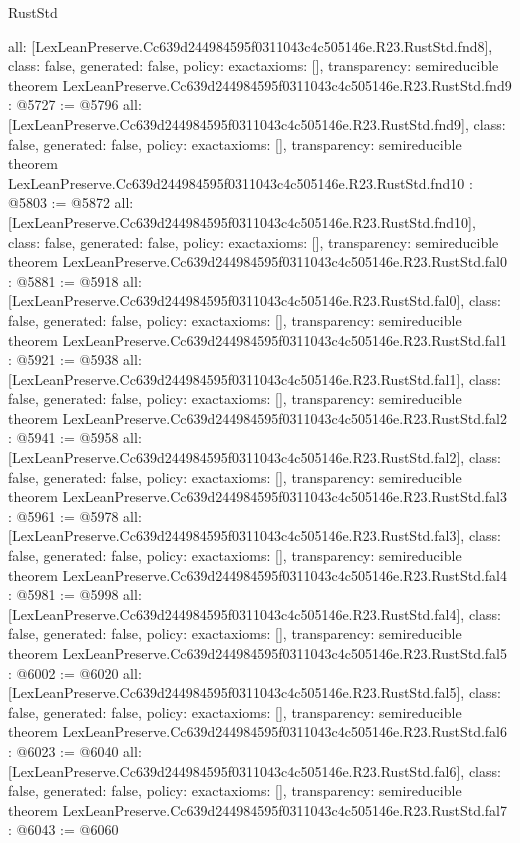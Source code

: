 \begin{lexlean}{RustStd}
\begin{coremodule}
{  all: [LexLeanPreserve.Cc639d244984595f0311043c4c505146e.R23.RustStd.fnd8],
  class: false,
  generated: false,
  policy: exact{axioms: []},
  transparency: semireducible
}
theorem LexLeanPreserve.Cc639d244984595f0311043c4c505146e.R23.RustStd.fnd9 : @5727 := @5796 {
  all: [LexLeanPreserve.Cc639d244984595f0311043c4c505146e.R23.RustStd.fnd9],
  class: false,
  generated: false,
  policy: exact{axioms: []},
  transparency: semireducible
}
theorem LexLeanPreserve.Cc639d244984595f0311043c4c505146e.R23.RustStd.fnd10 : @5803 := @5872 {
  all: [LexLeanPreserve.Cc639d244984595f0311043c4c505146e.R23.RustStd.fnd10],
  class: false,
  generated: false,
  policy: exact{axioms: []},
  transparency: semireducible
}
theorem LexLeanPreserve.Cc639d244984595f0311043c4c505146e.R23.RustStd.fal0 : @5881 := @5918 {
  all: [LexLeanPreserve.Cc639d244984595f0311043c4c505146e.R23.RustStd.fal0],
  class: false,
  generated: false,
  policy: exact{axioms: []},
  transparency: semireducible
}
theorem LexLeanPreserve.Cc639d244984595f0311043c4c505146e.R23.RustStd.fal1 : @5921 := @5938 {
  all: [LexLeanPreserve.Cc639d244984595f0311043c4c505146e.R23.RustStd.fal1],
  class: false,
  generated: false,
  policy: exact{axioms: []},
  transparency: semireducible
}
theorem LexLeanPreserve.Cc639d244984595f0311043c4c505146e.R23.RustStd.fal2 : @5941 := @5958 {
  all: [LexLeanPreserve.Cc639d244984595f0311043c4c505146e.R23.RustStd.fal2],
  class: false,
  generated: false,
  policy: exact{axioms: []},
  transparency: semireducible
}
theorem LexLeanPreserve.Cc639d244984595f0311043c4c505146e.R23.RustStd.fal3 : @5961 := @5978 {
  all: [LexLeanPreserve.Cc639d244984595f0311043c4c505146e.R23.RustStd.fal3],
  class: false,
  generated: false,
  policy: exact{axioms: []},
  transparency: semireducible
}
theorem LexLeanPreserve.Cc639d244984595f0311043c4c505146e.R23.RustStd.fal4 : @5981 := @5998 {
  all: [LexLeanPreserve.Cc639d244984595f0311043c4c505146e.R23.RustStd.fal4],
  class: false,
  generated: false,
  policy: exact{axioms: []},
  transparency: semireducible
}
theorem LexLeanPreserve.Cc639d244984595f0311043c4c505146e.R23.RustStd.fal5 : @6002 := @6020 {
  all: [LexLeanPreserve.Cc639d244984595f0311043c4c505146e.R23.RustStd.fal5],
  class: false,
  generated: false,
  policy: exact{axioms: []},
  transparency: semireducible
}
theorem LexLeanPreserve.Cc639d244984595f0311043c4c505146e.R23.RustStd.fal6 : @6023 := @6040 {
  all: [LexLeanPreserve.Cc639d244984595f0311043c4c505146e.R23.RustStd.fal6],
  class: false,
  generated: false,
  policy: exact{axioms: []},
  transparency: semireducible
}
theorem LexLeanPreserve.Cc639d244984595f0311043c4c505146e.R23.RustStd.fal7 : @6043 := @6060 {
}
\end{coremodule}
\end{lexlean}
